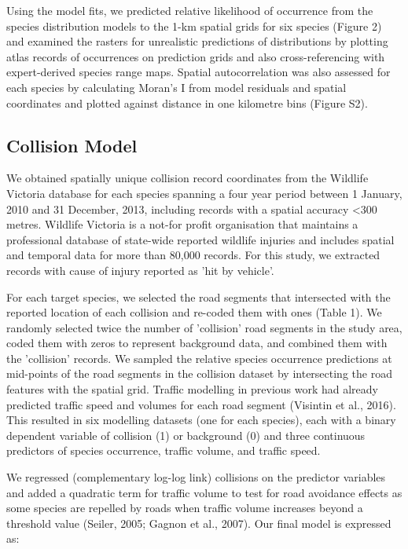 Using the model fits, we predicted relative likelihood of occurrence from the species distribution models to the 1-km spatial grids for six species (Figure 2) and examined the rasters for unrealistic predictions of distributions by plotting atlas records of occurrences on prediction grids and also cross-referencing with expert-derived species range maps. Spatial autocorrelation was also assessed for each species by calculating Moran’s I from model residuals and spatial coordinates and plotted against distance in one kilometre bins (Figure S2).

\subsection{Collision Model}

We obtained spatially unique collision record coordinates from the Wildlife Victoria database for each species spanning a four year period between 1 January, 2010 and 31 December, 2013, including records with a spatial accuracy <300 metres. Wildlife Victoria is a not-for profit organisation that maintains a professional database of state-wide reported wildlife injuries and includes spatial and temporal data for more than 80,000 records.  For this study, we extracted records with cause of injury reported as 'hit by vehicle'.

For each target species, we selected the road segments that intersected with the reported location of each collision and re-coded them with ones (Table 1).  We randomly selected twice the number of 'collision' road segments in the study area, coded them with zeros to represent background data, and combined them with the 'collision' records.  We sampled the relative species occurrence predictions at mid-points of the road segments in the collision dataset by intersecting the road features with the spatial grid.  Traffic modelling in previous work had already predicted traffic speed and volumes for each road segment (Visintin et al., 2016).  This resulted in six modelling datasets (one for each species), each with a binary dependent variable of collision (1) or background (0) and three continuous predictors of species occurrence, traffic volume, and traffic speed.

We regressed (complementary log-log link) collisions on the predictor variables and added a quadratic term for traffic volume to test for road avoidance effects as some species are repelled by roads when traffic volume increases beyond a threshold value (Seiler, 2005; Gagnon et al., 2007). Our final model is expressed as: 

